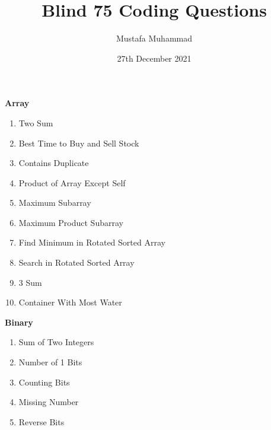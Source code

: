 \documentclass[24pt, a4]{article}
\title{Blind 75 Coding Questions}
\author{Mustafa Muhammad}
\date{27th December 2021}
\begin{document}
\maketitle

\begin{multicols}{2}
\textbf{Array}
\begin{enumerate}
    \item{Two Sum}
    \item{Best Time to Buy and Sell Stock}
    \item{Contains Duplicate}
    \item{Product of Array Except Self}
    \item{Maximum Subarray}
    \item{Maximum Product Subarray}
    \item{Find Minimum in Rotated Sorted Array}
    \item{Search in Rotated Sorted Array}
    \item{3 Sum}
    \item{Container With Most Water}
\end{enumerate}

\columnbreak
\textbf{Binary}
\begin{enumerate}
    \item{Sum of Two Integers}
    \item{Number of 1 Bits}
    \item{Counting Bits}
    \item{Missing Number}
    \item{Reverse Bits}
\end{enumerate}

\end{multicols}
\end{document}
